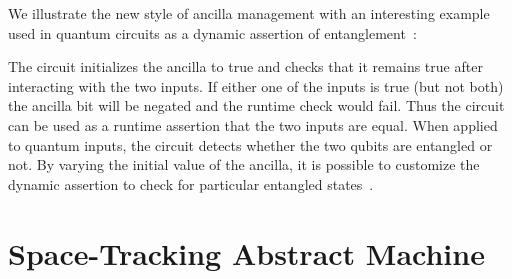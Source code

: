 \documentclass[sigplan,10pt,review,anonymous]{acmart}
\begin{document}
\PIFDUdef{}

\vspace{-\baselineskip}

\PIFDCombdef{}

\vspace{-\baselineskip}

\PIFDinterp{}

We illustrate the new style of ancilla management with an interesting
example used in quantum circuits as a dynamic assertion of
entanglement~\cite{DBLP:journals/cal/ZhouB19}:

\begin{figure}
  
\end{figure}  
\PIFDparity{}

\noindent The circuit initializes the ancilla to \textsf{true} and
checks that it remains \textsf{true} after interacting with the two
inputs. If either one of the inputs is \textsf{true} (but not both)
the ancilla bit will be negated and the runtime check would fail. Thus
the circuit can be used as a runtime assertion that the two inputs are
equal. When applied to quantum inputs, the circuit detects whether the
two qubits are entangled or not. By varying the initial value of the
ancilla, it is possible to customize the dynamic assertion to check
for particular entangled states~\cite{DBLP:journals/cal/ZhouB19}.

\section{Space-Tracking Abstract Machine}
\label{sec:space}  
\end{document}
